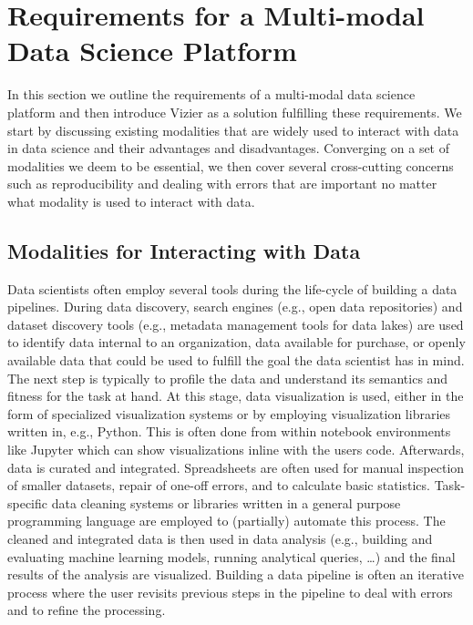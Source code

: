 \section{Requirements for a Multi-modal Data Science Platform}
\label{sec:requ-holist-data}

In this section we outline the requirements of a multi-modal data science platform and then introduce Vizier as a solution fulfilling these requirements. We start by discussing existing modalities that are widely used to interact with data in data science and their advantages and disadvantages. Converging on a set of modalities we deem to be essential, we then cover several cross-cutting concerns such as reproducibility and dealing with errors that are important no matter what modality is used to interact with data.

\subsection{Modalities for Interacting with Data}
\label{sec:modal-inter-with}

Data scientists often employ several tools during the life-cycle of building a data pipelines. During data discovery, search engines (e.g., open data repositories) and dataset discovery tools (e.g., metadata management tools for data lakes) are used to identify data internal to an organization, data available for purchase, or openly available data that could be used to fulfill the goal the data scientist has in mind. The next step is typically to profile the data and understand its semantics and fitness for the task at hand. At this stage, data visualization is used, either in the form of specialized visualization systems or by employing visualization libraries written in, e.g., Python. This is often done from within notebook environments like Jupyter which can show visualizations inline with the users code. Afterwards, data is curated and integrated. Spreadsheets are often used for manual inspection of smaller datasets, repair of one-off errors, and to calculate basic statistics. Task-specific data cleaning systems or libraries written in a general purpose programming language are employed to (partially) automate this process. The cleaned and integrated data is then used in data analysis (e.g., building and evaluating machine learning models, running analytical queries, \ldots) and the final results of the analysis are visualized. Building a data pipeline is often an iterative process where the user revisits previous steps in the pipeline to deal with errors and to refine the processing.

